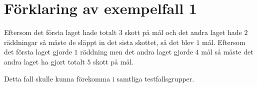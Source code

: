 \section*{Förklaring av exempelfall 1}
Eftersom det första laget hade totalt $3$ skott på mål och det andra laget hade $2$ räddningar så måste de släppt in det sista skottet, så det blev $1$ mål.
Eftersom det första laget gjorde $1$ räddning men det andra laget gjorde $4$ mål så måste det andra laget ha gjort totalt $5$ skott på mål.

Detta fall skulle kunna förekomma i samtliga testfallsgrupper.
